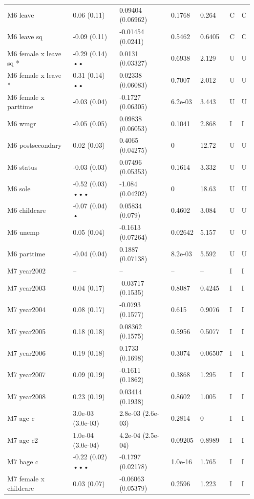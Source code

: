 {\begin{longtable}{@{}p{.245\linewidth}p{.17\linewidth}p{.17\linewidth}p{.085\linewidth}p{.060\linewidth}p{.08\linewidth}p{.07\linewidth}@{}}
M6 leave & 0.06 (0.11) & 0.09404 (0.06962) & 0.1768 & 0.264 & C & C\\
M6 leave sq & -0.09 (0.11) & -0.01454 (0.0241) & 0.5462 & 0.6405 & C & C\\
M6 female x leave sq * & -0.29 (0.14) •• & 0.0131 (0.03327) & 0.6938 & 2.129 & U & U\\
M6 female x leave * & 0.31 (0.14) •• & 0.02338 (0.06083) & 0.7007 & 2.012 & U & U\\
M6 female x parttime & -0.03 (0.04) & -0.1727 (0.06305) & 6.2e-03 & 3.443 & U & U\\
M6 wmgr & -0.05 (0.05) & 0.09838 (0.06053) & 0.1041 & 2.868 & I & I\\
M6 postsecondary & 0.02 (0.03) & 0.4065 (0.04275) & 0 & 12.72 & U & U\\
M6 status & -0.03 (0.03) & 0.07496 (0.05353) & 0.1614 & 3.332 & U & U\\
M6 sole & -0.52 (0.03) ••• & -1.084 (0.04202) & 0 & 18.63 & U & U\\
M6 childcare & -0.07 (0.04) • & 0.05834 (0.079) & 0.4602 & 3.084 & U & U\\
M6 unemp & 0.05 (0.04) & -0.1613 (0.07264) & 0.02642 & 5.157 & U & U\\
M6 parttime & -0.04 (0.04) & 0.1887 (0.07138) & 8.2e-03 & 5.592 & U & U\\
M7 year2002 & -- & -- & -- & -- & I & I\\
M7 year2003 & 0.04 (0.17) & -0.03717 (0.1535) & 0.8087 & 0.4245 & I & I\\
M7 year2004 & 0.08 (0.17) & -0.0793 (0.1577) & 0.615 & 0.9076 & I & I\\
M7 year2005 & 0.18 (0.18) & 0.08362 (0.1575) & 0.5956 & 0.5077 & I & I\\
M7 year2006 & 0.19 (0.18) & 0.1733 (0.1698) & 0.3074 & 0.06507 & I & I\\
M7 year2007 & 0.09 (0.19) & -0.1611 (0.1862) & 0.3868 & 1.295 & I & I\\
M7 year2008 & 0.23 (0.19) & 0.03414 (0.1938) & 0.8602 & 1.005 & I & I\\
M7 age c & 3.0e-03 (3.0e-03) & 2.8e-03 (2.6e-03) & 0.2814 & 0 & I & I\\
M7 age c2 & 1.0e-04 (3.0e-04) & 4.2e-04 (2.5e-04) & 0.09205 & 0.8989 & I & I\\
M7 bage c & -0.22 (0.02) ••• & -0.1797 (0.02178) & 1.0e-16 & 1.765 & I & I\\
M7 female x childcare & 0.03 (0.07) & -0.06063 (0.05379) & 0.2596 & 1.223 & I & I\\

\end{longtable}}
